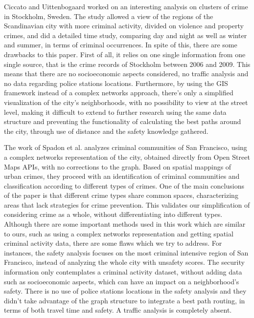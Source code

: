 \documentclass[runningheads]{llncs}
\begin{document}
Ciccato and Uittenbogaard \cite{ceccato_space-time_2012} worked on an interesting analysis on clusters of crime in Stockholm, Sweden. The study allowed a view of the regions of the Scandinavian city with more criminal activity, divided on violence and property crimes, and did a detailed time study, comparing day and night as well as winter and summer, in terms of criminal occurrences. In spite of this, there are some drawbacks to this paper. First of all, it relies on one single information from one single source, that is the crime records of Stockholm between 2006 and 2009. This means that there are no socioeconomic aspects considered, no traffic analysis and no data regarding police stations locations. Furthermore, by using the GIS framework instead of a complex networks approach, there's only a simplified visualization of the city's neighborhoods, with no possibility to view at the street level, making it difficult to extend to further research using the same data structure and preventing the functionality of calculating the best paths around the city, through use of distance and the safety knowledge gathered.


The work of Spadon et al. \cite{spadon_complex_2016} analyzes criminal communities of San Francisco, using a complex networks representation of the city, obtained directly from Open Street Maps \cite{noauthor_open_nodate} APIs, with no corrections to the graph. Based on spatial mappings of urban crimes, they proceed with an identification of criminal communities and classification according to different types of crimes. One of the main conclusions of the paper is that different crime types share common spaces, characterizing areas that lack strategies for crime prevention. This validates our simplification of considering crime as a whole, without differentiating into different types. Although there are some important methods used in this work which are similar to ours, such as using a complex networks representation and getting spatial criminal activity data, there are some flaws which we try to address. For instances, the safety analysis focuses on the most criminal intensive region of San Francisco, instead of analyzing the whole city with unsafety scores. The security information only contemplates a criminal activity dataset, without adding data such as socioeconomic aspects, which can have an impact on a neighborhood's safety. There is no use of police stations locations in the safety analysis and they didn't take advantage of the graph structure to integrate a best path routing, in terms of both travel time and safety. A traffic analysis is completely absent.
\end{document}

